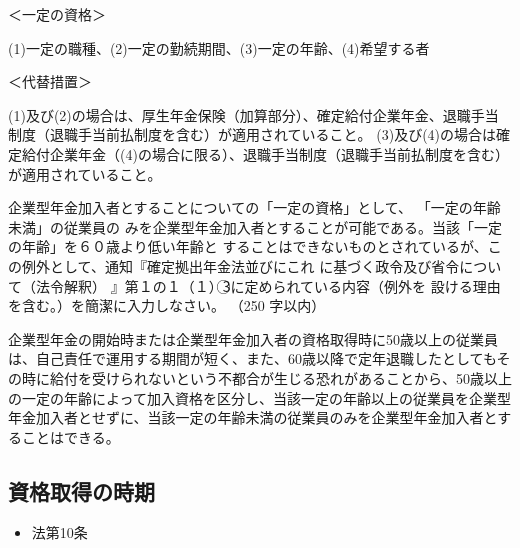 \begin{answerbox}
  ＜一定の資格＞

(1)一定の職種、(2)一定の勤続期間、(3)一定の年齢、(4)希望する者

＜代替措置＞

(1)及び(2)の場合は、厚生年金保険（加算部分）、確定給付企業年金、退職手当制度（退職手当前払制度を含む）が適用されていること。
(3)及び(4)の場合は確定給付企業年金（(4)の場合に限る）、退職手当制度（退職手当前払制度を含む）が適用されていること。
\end{answerbox}

\begin{shortanswer}[年金1 2024 問題2(2)ア]
  企業型年金加入者とすることについての「一定の資格」として、 「一定の年齢未満」の従業員の
みを企業型年金加入者とすることが可能である。当該「一定の年齢」を６０歳より低い年齢と
することはできないものとされているが、この例外として、通知『確定拠出年金法並びにこれ
に基づく政令及び省令について（法令解釈） 』第１の１（１）\textcircled{3}に定められている内容（例外を
設ける理由を含む。）を簡潔に入力しなさい。 （250 字以内）
\end{shortanswer}

\begin{answerbox}
  企業型年金の開始時または企業型年金加入者の資格取得時に50歳以上の従業員は、自己責任で運用する期間が短く、また、60歳以降で定年退職したとしてもその時に給付を受けられないという不都合が生じる恐れがあることから、50歳以上の一定の年齢によって加入資格を区分し、当該一定の年齢以上の従業員を企業型年金加入者とせずに、当該一定の年齢未満の従業員のみを企業型年金加入者とすることはできる。
\end{answerbox}


\newpage

\subsection{資格取得の時期}

\begin{InyouJobunbox}
  \begin{itemize}
    \item 法第10条
  \end{itemize}
\end{InyouJobunbox}


